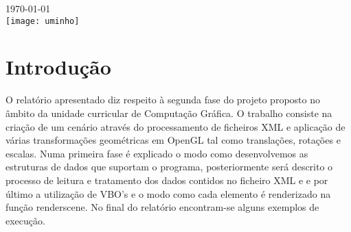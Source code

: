 \documentclass[12pt]{article}
\begin{document}
\begin{titlepage}

{\large \today}\\[2cm]


\texttt{[image: uminho]}\\
    

\vfill %

\end{titlepage}
\tableofcontents
\newpage
\section{Introdução}
O relatório apresentado diz respeito à segunda fase  do projeto proposto no âmbito da unidade curricular de
Computação Gráfica. O trabalho consiste na criação de um cenário através do processamento de ficheiros XML e aplicação de várias
transformações geométricas em OpenGL tal como translações, rotações e escalas.
Numa primeira fase é explicado o modo como desenvolvemos as estruturas de dados que suportam o programa, posteriormente será descrito
o processo de leitura e tratamento dos dados contidos no ficheiro XML e e por último a utilização de VBO's e o modo como
cada elemento é renderizado na função renderscene. No final do relatório encontram-se alguns exemplos de execução.
\newpage
\end{document}
